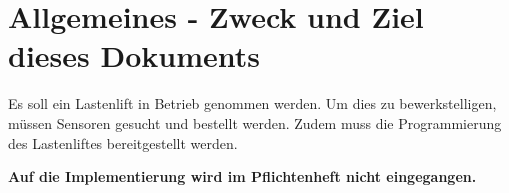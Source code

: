 \section{Allgemeines - Zweck und Ziel dieses Dokuments}

Es soll ein Lastenlift in Betrieb genommen werden. Um dies zu bewerkstelligen, müssen Sensoren gesucht und bestellt werden. Zudem muss die Programmierung des Lastenliftes bereitgestellt werden.

\textbf{Auf die Implementierung wird im Pflichtenheft nicht eingegangen.}
